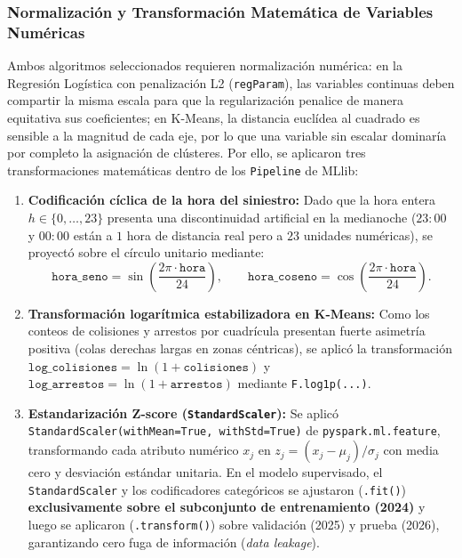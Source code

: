 \subsubsection{Normalización y Transformación Matemática de Variables Numéricas}
\label{subsubsec:num4b_normalizacion}

Ambos algoritmos seleccionados requieren normalización numérica: en la Regresión Logística con penalización L2 (\texttt{regParam}), las variables continuas deben compartir la misma escala para que la regularización penalice de manera equitativa sus coeficientes; en K-Means, la distancia euclídea al cuadrado es sensible a la magnitud de cada eje, por lo que una variable sin escalar dominaría por completo la asignación de clústeres. Por ello, se aplicaron tres transformaciones matemáticas dentro de los \texttt{Pipeline} de MLlib:

\begin{enumerate}
    \item \textbf{Codificación cíclica de la hora del siniestro:} Dado que la hora entera $h \in \{0, \dots, 23\}$ presenta una discontinuidad artificial en la medianoche ($23:00$ y $00:00$ están a $1$ hora de distancia real pero a $23$ unidades numéricas), se proyectó sobre el círculo unitario mediante:
    \[
    \texttt{hora\_seno} = \sin\!\left(\frac{2\pi \cdot \texttt{hora}}{24}\right), \qquad
    \texttt{hora\_coseno} = \cos\!\left(\frac{2\pi \cdot \texttt{hora}}{24}\right).
    \]
    \item \textbf{Transformación logarítmica estabilizadora en K-Means:} Como los conteos de colisiones y arrestos por cuadrícula presentan fuerte asimetría positiva (colas derechas largas en zonas céntricas), se aplicó la transformación $\texttt{log\_colisiones} = \ln(1 + \texttt{colisiones})$ y $\texttt{log\_arrestos} = \ln(1 + \texttt{arrestos})$ mediante \texttt{F.log1p(...)}.
    \item \textbf{Estandarización Z-score (\texttt{StandardScaler}):} Se aplicó \texttt{StandardScaler(withMean=True, withStd=True)} de \texttt{pyspark.ml.feature}, transformando cada atributo numérico $x_j$ en $z_j = (x_j - \mu_j)/\sigma_j$ con media cero y desviación estándar unitaria. En el modelo supervisado, el \texttt{StandardScaler} y los codificadores categóricos se ajustaron (\texttt{.fit()}) \textbf{exclusivamente sobre el subconjunto de entrenamiento (2024)} y luego se aplicaron (\texttt{.transform()}) sobre validación (2025) y prueba (2026), garantizando cero fuga de información (\textit{data leakage}).
\end{enumerate}

